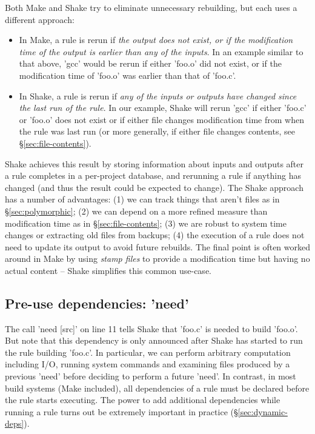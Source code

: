 Both Make and Shake try to eliminate unnecessary rebuilding, but each
uses a different approach:

\begin{itemize}
\item In Make, a rule is rerun if \emph{the output does not exist, or if the
modification time of the output is earlier than any of the inputs}. In an example
similar to that above, \lst'gcc' would be rerun if either \lst'foo.o' did not
exist, or if the modification time of \lst'foo.o' was earlier than that of
\lst'foo.c'.
\item In Shake, a rule is rerun if \emph{any of the inputs or outputs have changed since the
last run of the rule}. In our example, Shake will rerun \lst'gcc' if
either \lst'foo.c' or \lst'foo.o' does not exist or if either file
changes modification time from when the rule was last run (or more
generally, if either file changes contents, see
\S\ref{sec:file-contents}).
\end{itemize}
\noindent
Shake achieves this result by storing information about inputs and outputs after a rule
completes in a per-project database, and rerunning a rule if anything has
changed (and thus the result could be expected to change). The Shake approach
has a number of advantages: (1) we can track things that aren't files as in
\S\ref{sec:polymorphic}; (2) we can depend on a more refined measure than
modification time as in \S\ref{sec:file-contents}; (3) we are robust to system
time changes or extracting old files from backups; (4) the execution of a rule
does not need to update its output to avoid future rebuilds. The final point is
often worked around in Make by using \emph{stamp files} to provide a modification
time but having no actual content -- Shake simplifies this common use-case.

\subsection{Pre-use dependencies: \lst'need'\label{sec:need}}

The call \lst'need [src]' on line 11 tells Shake that \lst'foo.c' is needed
to build \lst'foo.o'. But note that this dependency is only announced
after Shake has started to run the rule building \lst'foo.c'.
In particular, we can perform
arbitrary computation including I/O, running system commands and examining files
produced by a previous \lst'need' before deciding to perform a future \lst'need'.
In contrast, in most build systems (Make included), all dependencies of a rule must be
declared before the rule starts executing. The power to add additional dependencies
while running a rule turns out be extremely important in practice (\S\ref{sec:dynamic-deps}).

